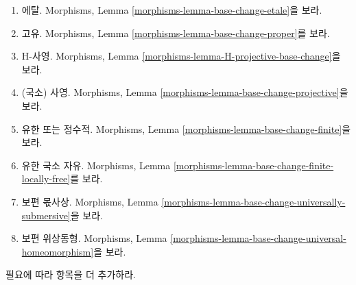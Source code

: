 \begin{remark}
\begin{enumerate}
\ref{morphisms-lemma-base-change-unramified}를 보라.
\item 에탈. Morphisms, Lemma
\ref{morphisms-lemma-base-change-etale}을 보라.
\item 고유. Morphisms, Lemma
\ref{morphisms-lemma-base-change-proper}를 보라.
\item H-사영. Morphisms, Lemma
\ref{morphisms-lemma-H-projective-base-change}을 보라.
\item (국소) 사영. Morphisms, Lemma
\ref{morphisms-lemma-base-change-projective}을 보라.
\item 유한 또는 정수적. Morphisms, Lemma
\ref{morphisms-lemma-base-change-finite}을 보라.
\item 유한 국소 자유. Morphisms, Lemma
\ref{morphisms-lemma-base-change-finite-locally-free}를 보라.
\item 보편 몫사상. Morphisms, Lemma
\ref{morphisms-lemma-base-change-universally-submersive}을 보라.
\item 보편 위상동형. Morphisms, Lemma
\ref{morphisms-lemma-base-change-universal-homeomorphism}을 보라.
\end{enumerate}
필요에 따라 항목을 더 추가하라.
\end{remark}


